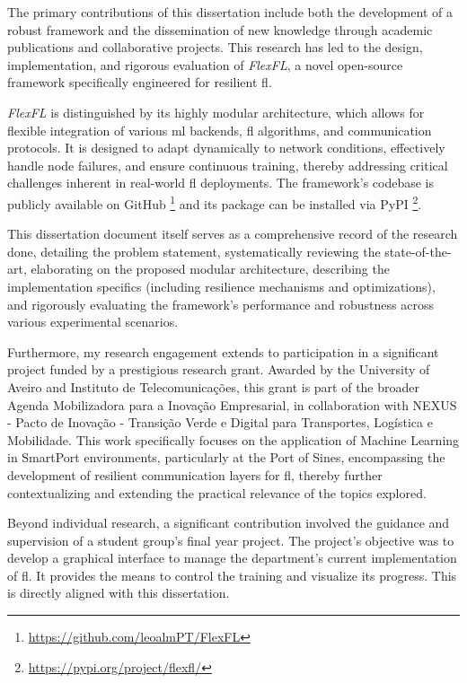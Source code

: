 The primary contributions of this dissertation include both the development of a robust framework and the dissemination of new knowledge through academic publications and collaborative projects. This research has led to the design, implementation, and rigorous evaluation of \textit{FlexFL}, a novel open-source framework specifically engineered for resilient \ac{fl}. 

\textit{FlexFL} is distinguished by its highly modular architecture, which allows for flexible integration of various \ac{ml} backends, \ac{fl} algorithms, and communication protocols. It is designed to adapt dynamically to network conditions, effectively handle node failures, and ensure continuous training, thereby addressing critical challenges inherent in real-world \ac{fl} deployments. The framework's codebase is publicly available on GitHub \footnote{\url{https://github.com/leoalmPT/FlexFL}} and its package can be installed via PyPI \footnote{\url{https://pypi.org/project/flexfl/}}.

This dissertation document itself serves as a comprehensive record of the research done, detailing the problem statement, systematically reviewing the state-of-the-art, elaborating on the proposed modular architecture, describing the implementation specifics (including resilience mechanisms and optimizations), and rigorously evaluating the framework's performance and robustness across various experimental scenarios.

Furthermore, my research engagement extends to participation in a significant project funded by a prestigious research grant. Awarded by the University of Aveiro and Instituto de Telecomunicações, this grant is part of the broader Agenda Mobilizadora para a Inovação Empresarial, in collaboration with NEXUS - Pacto de Inovação - Transição Verde e Digital para Transportes, Logística e Mobilidade. This work specifically focuses on the application of Machine Learning in SmartPort environments, particularly at the Port of Sines, encompassing the development of resilient communication layers for \ac{fl}, thereby further contextualizing and extending the practical relevance of the topics explored.

Beyond individual research, a significant contribution involved the guidance and supervision of a student group's final year project. The project's objective was to develop a graphical interface to manage the department's current implementation of \ac{fl}. It provides the means to control the training and visualize its progress. This is directly aligned with this dissertation.

